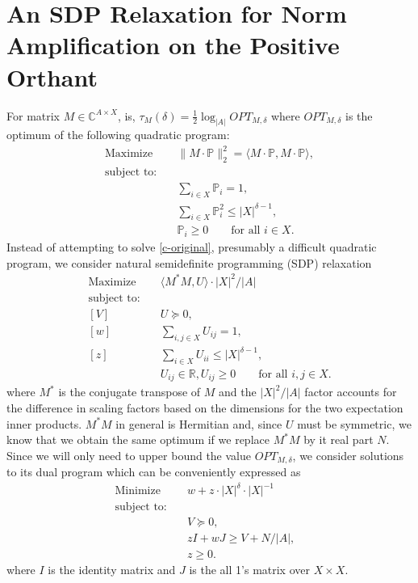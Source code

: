 \newcommand{\realm}{N}
\section{An SDP Relaxation for Norm Amplification on the Positive Orthant}
\label{c-sec:sdp}

For matrix $M\in \mathbb{C}^{A\times X}$, 
 is, $\tau_M(\delta)=\frac12 \log_{|A|} OPT_{M,\delta}$ where $OPT_{M,\delta}$ is the
optimum of the following quadratic program:
\begin{equation}
\begin{aligned}\label{c-original}
\text{Maximize}  &\quad \|M\cdot \mathbb{P}\|_2^2=\langle M\cdot \mathbb{P},M\cdot \mathbb{P}\rangle, \\
\text{subject to:}&\\
&\quad \sum_{i\in X} \mathbb{P}_i=1,\\
&\quad \sum_{i\in X} \mathbb{P}_i^2\le |X|^{\delta-1},\\
&\quad \mathbb{P}_i\geq 0 \qquad \text{for all }i\in X.
\end{aligned}
\end{equation}
Instead of attempting to solve \eqref{c-original}, presumably a difficult
quadratic program, we consider natural semidefinite programming (SDP) relaxation
\begin{equation} \label{c-SDP-relaxation}
\begin{aligned}
\text{Maximize}&\quad \langle M^{*} M,U\rangle\cdot |X|^2/|A| \\
\text{subject to:} &\\
[V]&\quad U\succeq 0,\\
[w]&\quad \sum_{i,j\in X} U_{ij}=1,  \\
[z]&\quad \sum_{i\in X} U_{ii}\le |X|^{\delta-1},\\
&\quad U_{ij}\in \mathbb{R},U_{ij}\geq 0 \qquad\text{for all } i,j\in X.
\end{aligned}
\end{equation}
where $M^{*}$ is the conjugate transpose of $M$ and
the $|X|^2/|A|$ factor
accounts for the difference in scaling factors based on the dimensions for the
two expectation inner products.  $M^*M$ in general is Hermitian and, since
$U$ must be symmetric, we know that we obtain the same optimum if we replace
$M^* M$ by it real part $N$.
Since we will only need to upper bound the value $OPT_{M,\delta}$,
we consider solutions to its dual program which can be conveniently expressed as
\begin{equation} \label{c-dual-SDP1}
\begin{aligned}
\text{Minimize}  &\quad w+z\cdot |X|^{\delta}\cdot |X|^{-1} &\\
\text{subject to:}&&\\
&\quad V\succeq 0,&\\
&\quad z I + w J\geq V+ \realm/|A|,\\
&\quad z\ge 0.
\end{aligned}
\end{equation}
where $I$ is the identity matrix and $J$ is the all 1's matrix over $X\times X$.

